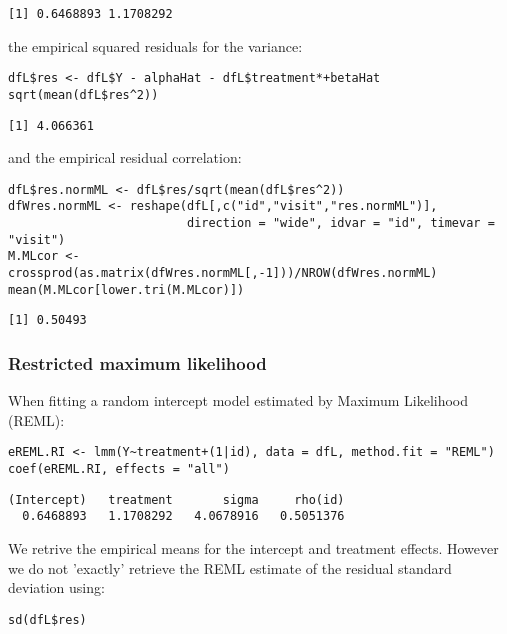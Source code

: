 \documentclass[12pt]{article}
\begin{document}
\begin{verbatim}
[1] 0.6468893 1.1708292
\end{verbatim}


the empirical squared residuals for the variance:
\lstset{language=r,label= ,caption= ,captionpos=b,numbers=none}
\begin{lstlisting}
dfL$res <- dfL$Y - alphaHat - dfL$treatment*+betaHat
sqrt(mean(dfL$res^2))
\end{lstlisting}

\begin{verbatim}
[1] 4.066361
\end{verbatim}


\clearpage

and the empirical residual correlation:
\lstset{language=r,label= ,caption= ,captionpos=b,numbers=none}
\begin{lstlisting}
dfL$res.normML <- dfL$res/sqrt(mean(dfL$res^2))
dfWres.normML <- reshape(dfL[,c("id","visit","res.normML")],
                         direction = "wide", idvar = "id", timevar = "visit")
M.MLcor <- crossprod(as.matrix(dfWres.normML[,-1]))/NROW(dfWres.normML)
mean(M.MLcor[lower.tri(M.MLcor)])
\end{lstlisting}

\begin{verbatim}
[1] 0.50493
\end{verbatim}

\subsubsection{Restricted maximum likelihood}
\label{sec:org34b9995}

When fitting a random intercept model estimated by Maximum Likelihood
(REML):
\lstset{language=r,label= ,caption= ,captionpos=b,numbers=none}
\begin{lstlisting}
eREML.RI <- lmm(Y~treatment+(1|id), data = dfL, method.fit = "REML")
coef(eREML.RI, effects = "all")
\end{lstlisting}

\begin{verbatim}
(Intercept)   treatment       sigma     rho(id) 
  0.6468893   1.1708292   4.0678916   0.5051376
\end{verbatim}


We retrive the empirical means for the intercept and treatment
effects.  However we do not 'exactly' retrieve the REML estimate of the residual
standard deviation using:
\lstset{language=r,label= ,caption= ,captionpos=b,numbers=none}
\begin{lstlisting}
sd(dfL$res)
\end{lstlisting}
\end{document}
